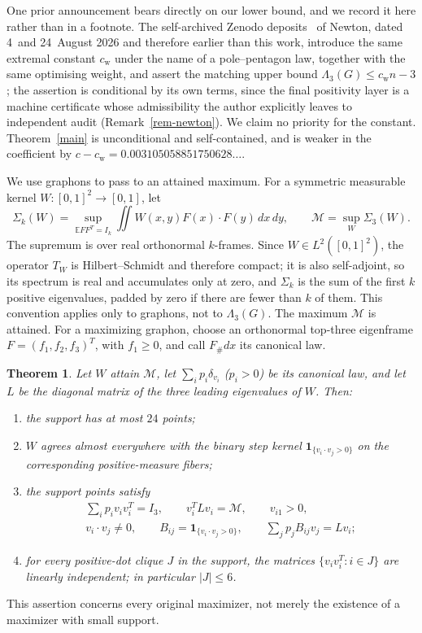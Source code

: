 \documentclass[11pt]{article}
\newtheorem{theorem}{Theorem}[section]
\theoremstyle{remark}\newtheorem{remark}[theorem]{Remark}
\newcommand{\E}{\mathbb E}
\newcommand{\cstar}{c_{\mathrm{w}}}
\numberwithin{equation}{section}
\begin{document}
One prior announcement bears directly on our lower bound, and we record it
here rather than in a footnote. The self-archived Zenodo
deposits~\cite{Newton1,Newton2} of Newton, dated 4~and 24~August 2026 and
therefore earlier than this work, introduce the same extremal constant
$\cstar$ under the name of a pole--pentagon law, together with the same
optimising weight, and assert the matching upper bound
$\Lambda_3(G)\le\cstar n-3$; the assertion is conditional by its own terms,
since the final positivity layer is a machine certificate whose
admissibility the author explicitly leaves to independent audit
(Remark~\ref{rem-newton}). We claim no priority for the constant.
Theorem~\ref{main} is unconditional and self-contained, and is weaker in
the coefficient by $c-\cstar=0.003105058851750628\ldots$.

We use graphons to pass to an attained maximum. For a symmetric measurable
kernel $W:[0,1]^2\to[0,1]$, let
\begin{equation}\label{sig-definition}
 \Sigma_k(W)=\sup_{\E FF^T=I_k}
       \iint W(x,y)F(x)\cdot F(y)\,dx\,dy,
 \qquad \mathcal M=\sup_W\Sigma_3(W).
\end{equation}
The supremum is over real orthonormal $k$-frames. Since $W\in L^2([0,1]^2)$,
the operator $T_W$ is Hilbert--Schmidt and therefore compact; it is also
self-adjoint, so its spectrum is real and accumulates only at zero, and
$\Sigma_k$ is the sum of the first $k$ positive eigenvalues, padded by zero
if there are fewer than $k$ of them. This convention applies only to
graphons, not to $\Lambda_3(G)$.
The maximum $\mathcal M$ is attained. For a maximizing graphon, choose an
orthonormal top-three eigenframe $F=(f_1,f_2,f_3)^T$, with $f_1\ge0$,
and call $F_\#dx$ its canonical law.

\begin{theorem}\label{structure-main}
Let $W$ attain $\mathcal M$, let $\sum_i p_i\delta_{v_i}$ ($p_i>0$) be its
canonical law, and let $L$ be the diagonal matrix of the three leading
eigenvalues of $W$. Then:
\begin{enumerate}[leftmargin=2.2em,itemsep=2pt]
\item[(a)] the support has at most $24$ points;
\item[(b)] $W$ agrees almost everywhere with the binary step kernel
$\mathbf1_{\{v_i\cdot v_j>0\}}$ on the corresponding positive-measure
fibers;
\item[(c)] the support points satisfy
\begin{gather*}
 \sum_i p_iv_iv_i^T=I_3,\qquad v_i^TLv_i=\mathcal M,\qquad v_{i1}>0,\\
 v_i\cdot v_j\ne0,\qquad
 B_{ij}=\mathbf1_{\{v_i\cdot v_j>0\}},\qquad
 \sum_jp_jB_{ij}v_j=Lv_i;
\end{gather*}
\item[(d)] for every positive-dot clique $J$ in the support, the matrices
$\{v_iv_i^T:i\in J\}$ are linearly independent; in particular $|J|\le6$.
\end{enumerate}
\end{theorem}
This assertion concerns every original maximizer, not merely the
existence of a maximizer with small support.
\end{document}
